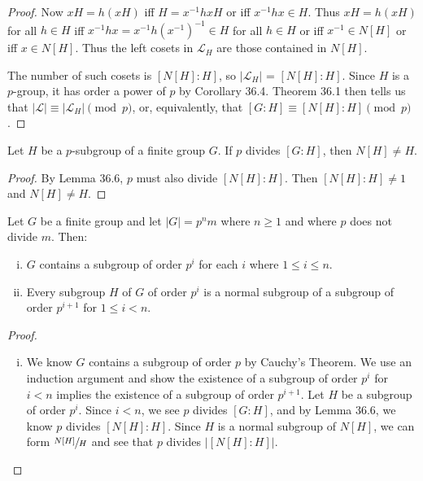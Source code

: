 \documentclass[a4paper,11pt]{article}
\begin{document}
\begin{outline}
\begin{proof}
      Now \(xH = h(xH)\) iff \(H = x^{-1}hxH\) or iff \(x^{-1}hx \in H\). Thus \(xH = h(xH)\) for all \(h \in H\) iff 
      \(x^{-1}hx = x^{-1}h(x^{-1})^{-1} \in H\) for all \(h \in H\) or iff \(x^{-1} \in N[H]\) or iff \(x \in N[H]\).
      Thus the left cosets in \(\mathcal{L}_H\) are those contained in \(N[H]\). 
      
      The number of such cosets is \([N[H]:H]\), so \(|\mathcal{L}_H|\) = \([N[H]:H]\). Since \(H\) is a \(p\)-group, 
      it has order a power of \(p\) by Corollary 36.4. Theorem 36.1 then tells us that 
      \(|\mathcal{L}| \equiv |\mathcal{L}_H| \pmod{p}\), or, equivalently, that \([G:H] \equiv [N[H]:H] \pmod{p}\).    
    \end{proof}
      
    Let \(H\) be a \(p\)-subgroup of a finite group \(G\). If \(p\) divides \([G:H]\), then \(N[H] \neq H\).
    
    \begin{proof}
      By Lemma 36.6, \(p\) must also divide \([N[H]:H]\). Then \([N[H]:H] \neq 1\) and \(N[H] \neq H\).
    \end{proof}

    Let \(G\) be a finite group and let \(|G| = p^nm\) where \(n \geq 1\) and where \(p\) does not divide \(m\). Then:
    \begin{enumerate}[i.]
      \item \(G\) contains a subgroup of order \(p^i\) for each \(i\) where \(1 \leq i \leq n\).
      \item Every subgroup \(H\) of \(G\) of order \(p^i\) is a normal subgroup of a subgroup of order \(p^{i+1}\)
      for \(1 \leq i < n\).
    \end{enumerate}
    
    \begin{proof}
      \begin{enumerate}[i.]
        \item 
          We know \(G\) contains a subgroup of order \(p\) by Cauchy's Theorem. We use an induction argument and show
          the existence of a subgroup of order \(p^i\) for \(i < n\) implies the existence of a subgroup of order 
          \(p^{i+1}\). Let \(H\) be a subgroup of order \(p^i\). Since \(i < n\), we see \(p\) divides \([G:H]\), 
          and by Lemma 36.6, we know \(p\) divides \([N[H]:H]\). Since \(H\) is a normal subgroup of \(N[H]\), we can 
          form \(\sfrac{N[H]}{H}\) and see that \(p\) divides \(|[N[H]:H]|\). 
          

\end{enumerate}
\end{proof}
\end{outline}
\end{document}

